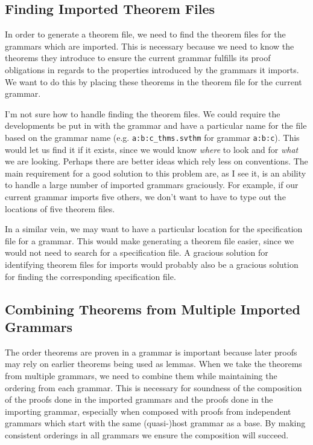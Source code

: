 \documentclass[11pt]{article}
\newcommand{\grammar}[1]{\texttt{#1}}
\begin{document}
\subsection{Finding Imported Theorem Files} \label{subsec:findingThmFiles}

In order to generate a theorem file, we need to find the theorem files
for the grammars which are imported.  This is necessary because we
need to know the theorems they introduce to ensure the current grammar
fulfills its proof obligations in regards to the properties introduced
by the grammars it imports.  We want to do this by placing these
theorems in the theorem file for the current grammar.


I'm not sure how to handle finding the theorem files.  We could
require the developments be put in with the grammar and have a
particular name for the file based on the grammar name
(e.g. \texttt{a:b:c\_thms.svthm} for grammar \grammar{a:b:c}).  This
would let us find it if it exists, since we would know \emph{where} to
look and for \emph{what} we are looking.  Perhaps there are better
ideas which rely less on conventions.  The main requirement for a good
solution to this problem are, as I see it, is an ability to handle a
large number of imported grammars graciously.  For example, if our
current grammar imports five others, we don't want to have to type out
the locations of five theorem files.


In a similar vein, we may want to have a particular location for the
specification file for a grammar.  This would make generating a
theorem file easier, since we would not need to search for a
specification file.  A gracious solution for identifying theorem files
for imports would probably also be a gracious solution for finding the
corresponding specification file.




\subsection{Combining Theorems from Multiple Imported Grammars} \label{subsec:ordering}

The order theorems are proven in a grammar is important because later
proofs may rely on earlier theorems being used as lemmas.  When we
take the theorems from multiple grammars, we need to combine them
while maintaining the ordering from each grammar.  This is necessary
for soundness of the composition of the proofs done in the imported
grammars and the proofs done in the importing grammar, especially when
composed with proofs from independent grammars which start with the
same (quasi-)host grammar as a base.  By making consistent orderings
in all grammars we ensure the composition will succeed.
\end{document}
